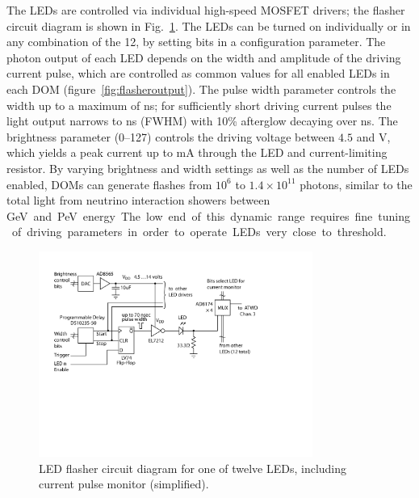 The LEDs are controlled via individual high-speed MOSFET drivers; the
flasher circuit diagram is shown in Fig.~\ref{fig:flasherdiagram}. The LEDs can be turned on individually or in any
combination of the 12, by setting bits in a configuration parameter.
The photon output of each LED depends on the width and
amplitude of the driving current pulse, which are controlled as common
values for all enabled LEDs in each DOM (figure~\ref{fig:flasheroutput}).  
The pulse width parameter controls the width up to a maximum of \unit[70]{ns}; 
for sufficiently short driving current pulses the light output narrows to \unit[6]{ns} (FWHM) with
10\% afterglow decaying over \unit[15--20]{ns}. The brightness parameter (0--127) controls the driving voltage between
$4.5$ and \unit[15]{V}, which yields a peak current up to
\unit[300]{mA} through the LED and current-limiting resistor.
By varying brightness and width settings as well as the number of LEDs enabled, DOMs can generate flashes
from $10^6$ to $1.4\times10^{11}$ photons, similar to the total light from
neutrino interaction showers between \unit[7]GeV and \unit[1]PeV energy.
The low end of this dynamic range requires fine tuning of driving
parameters in order to operate LEDs very close to threshold.

\begin{figure}[h]
 \centering
 \includegraphics[width=0.8\textwidth]{graphics/dom/functional/domfig4-FlasherDiagram.pdf}
 \caption{LED flasher circuit diagram for one of twelve LEDs, including current pulse monitor (simplified).}
 \label{fig:flasherdiagram}
\end{figure}

